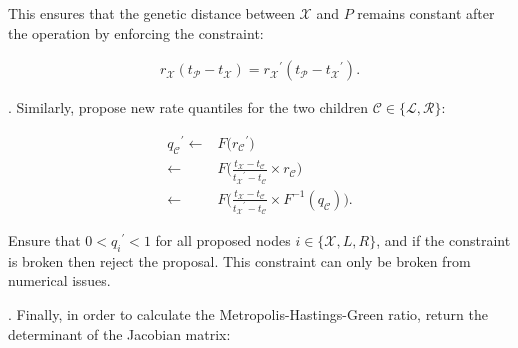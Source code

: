 \documentclass[12pt]{article}
\begin{document}
This ensures that the genetic distance between $\mathcal{X}$ and $P$ remains constant after the operation by enforcing the constraint:


\begin{align}
	r_\mathcal{X} (t_\mathcal{P} - t_\mathcal{X}) = {r_\mathcal{X}}^\prime (t_\mathcal{P} - {t_\mathcal{X}}^\prime).
\end{align}




. Similarly, propose new rate quantiles for the two children $\mathcal{C} \in \{\mathcal{L}, \mathcal{R}\}$:



\begin{align}
	{q_\mathcal{C}}^\prime  \leftarrow & F\Big({r_\mathcal{C}}^\prime \Big) \nonumber\\
				\leftarrow & F\Big(\frac{t_\mathcal{X} - t_\mathcal{C}}{{t_\mathcal{X}}^\prime - t_\mathcal{C}} \times r_\mathcal{C} \Big) \nonumber\\
				\leftarrow & F\Big(\frac{t_\mathcal{X} - t_\mathcal{C}}{{t_\mathcal{X}}^\prime - t_\mathcal{C}} \times F^{-1}(q_\mathcal{C}) \Big).
\end{align}


Ensure that $0 < {q_i}^\prime < 1$ for all proposed nodes $i \in \{\mathcal{X}, L, R\}$, and if the constraint is broken then reject the proposal. 
This constraint can only be broken from numerical issues.





. Finally, in order to calculate the Metropolis-Hastings-Green ratio, return the determinant of the Jacobian matrix:
\end{document}
